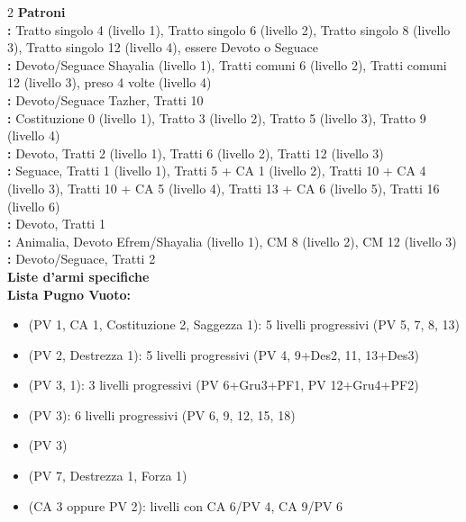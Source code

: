 \begin{multicols}{2}
\textbf{{\large Patroni}}\\

	\textbf{:} Tratto singolo 4 (livello 1), Tratto singolo 6 (livello 2), Tratto singolo 8 (livello 3), Tratto singolo 12 (livello 4), essere Devoto o Seguace\\

	\textbf{:} Devoto/Seguace Shayalia (livello 1), Tratti comuni 6 (livello 2), Tratti comuni 12 (livello 3),  preso 4 volte (livello 4)\\

	\textbf{:} Devoto/Seguace Tazher, Tratti 10\\

	\textbf{:} Costituzione 0 (livello 1), Tratto 3 (livello 2), Tratto 5 (livello 3), Tratto 9 (livello 4)\\

	\textbf{:} Devoto, Tratti 2 (livello 1), Tratti 6 (livello 2), Tratti 12 (livello 3)\\

	\textbf{:} Seguace, Tratti 1 (livello 1), Tratti 5 + CA 1 (livello 2), Tratti 10 + CA 4 (livello 3), Tratti 10 + CA 5 (livello 4), Tratti 13 + CA 6 (livello 5), Tratti 16 (livello 6)\\

	\textbf{:} Devoto, Tratti 1\\

	\textbf{:} Animalia, Devoto Efrem/Shayalia (livello 1), CM 8 (livello 2), CM 12 (livello 3)\\

	\textbf{:} Devoto/Seguace, Tratti 2\\

\textbf{{\large Liste d'armi specifiche}}\\

	\textbf{Lista Pugno Vuoto:}
	\begin{itemize}
		\item {} (PV 1, CA 1, Costituzione 2, Saggezza 1): 5 livelli progressivi (PV 5, 7, 8, 13)
		\item {} (PV 2, Destrezza 1): 5 livelli progressivi (PV 4, 9+Des2, 11, 13+Des3)
		\item {} (PV 3,  1): 3 livelli progressivi (PV 6+Gru3+PF1, PV 12+Gru4+PF2)
		\item {} (PV 3): 6 livelli progressivi (PV 6, 9, 12, 15, 18)
		\item {} (PV 3)
		\item {} (PV 7, Destrezza 1, Forza 1)
		\item {} (CA 3 oppure PV 2): livelli con CA 6/PV 4, CA 9/PV 6
	\end{itemize}


\end{multicols}
